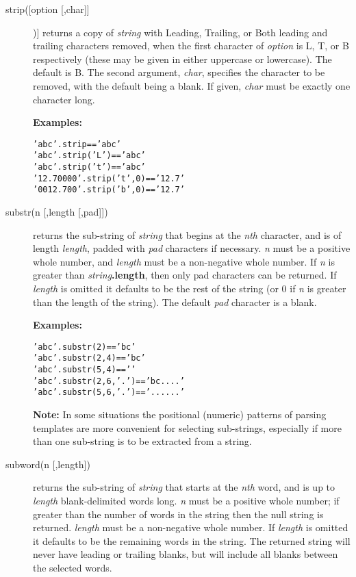 \begin{description}
\item[strip([option [,char{]]}])]\label{refstrip}
returns a copy of \emph{string} with Leading, Trailing, or Both
leading and trailing characters removed, when the first character of
\emph{option} is L, T, or B respectively (these may be given in
either uppercase or lowercase).  The default is B.
The second argument, \emph{char}, specifies the character to be
removed, with the default being a blank.
If given, \emph{char} must be exactly one character long.
 
\textbf{Examples:}
\begin{alltt}
'  ab c  '.strip        == 'ab c'
'  ab c  '.strip('L')   == 'ab c  '
'  ab c  '.strip('t')   == '  ab c'
'12.70000'.strip('t',0) == '12.7'
'0012.700'.strip('b',0) == '12.7'
\end{alltt}

\item[substr(n [,length [,pad{]]})]\label{refsubstr}
returns the sub-string of \emph{string} that begins at the
\emph{n}\emph{th} character, and is of length \emph{length}, padded
with \emph{pad} characters if necessary.
\emph{n} must be a positive whole number, and \emph{length} must
be a non-negative whole number.
If \emph{n} is greater than \emph{string}\textbf{.length},
then only pad characters can be returned.
 If \emph{length} is omitted it defaults to be the rest of the
string (or 0 if \emph{n} is greater than the length of the string).
The default \emph{pad} character is a blank.
 
\textbf{Examples:}
\begin{alltt}
'abc'.substr(2)       == 'bc'
'abc'.substr(2,4)     == 'bc  '
'abc'.substr(5,4)     == '    '
'abc'.substr(2,6,'.') == 'bc....'
'abc'.substr(5,6,'.') == '......'
\end{alltt}
\textbf{Note: }In some situations the positional (numeric) patterns of parsing
templates are more convenient for selecting sub-strings, especially if
more than one sub-string is to be extracted from a string.

\item[subword(n [,length{]})]\label{refsubword}
returns the sub-string of \emph{string} that starts at the
\emph{n}\emph{th} word, and is up to \emph{length} blank-delimited
words long.
\emph{n} must be a positive whole number; if greater than the number
of words in the string then the null string is returned.
\emph{length} must be a non-negative whole number.
If \emph{length} is omitted it defaults to be the remaining words
in the string.
The returned string will never have leading or trailing blanks, but
will include all blanks between the selected words.
 

\end{description}
